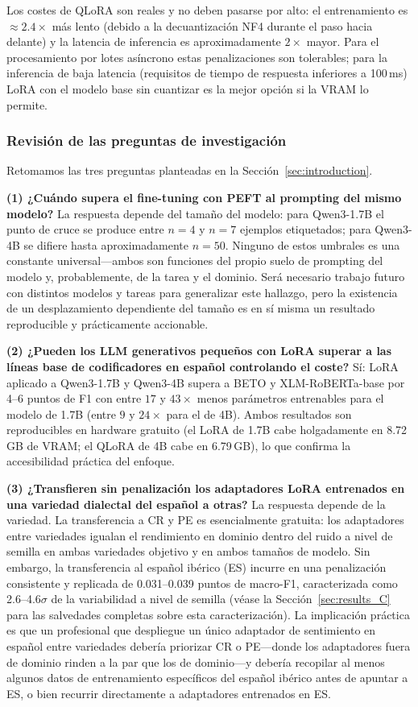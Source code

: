 \documentclass[conference]{IEEEtran}
\begin{document}
Los costes de QLoRA son reales y no deben pasarse por alto: el entrenamiento es
$\approx\!2.4\times$ más lento (debido a la decuantización NF4 durante el paso
hacia delante) y la latencia de inferencia es aproximadamente $2\times$ mayor.
Para el procesamiento por lotes asíncrono estas penalizaciones son tolerables;
para la inferencia de baja latencia (requisitos de tiempo de respuesta
inferiores a 100\,ms) LoRA con el modelo base sin cuantizar es la mejor opción
si la VRAM lo permite.

\subsubsection*{Revisión de las preguntas de investigación}

Retomamos las tres preguntas planteadas en la Sección~\ref{sec:introduction}.

\textbf{(1) ¿Cuándo supera el fine-tuning con PEFT al prompting del mismo
modelo?}
La respuesta depende del tamaño del modelo: para Qwen3-1.7B el punto de cruce se
produce entre $n=4$ y $n=7$ ejemplos etiquetados; para Qwen3-4B se difiere hasta
aproximadamente $n=50$.
Ninguno de estos umbrales es una constante universal---ambos son funciones del
propio suelo de prompting del modelo y, probablemente, de la tarea y el dominio.
Será necesario trabajo futuro con distintos modelos y tareas para generalizar
este hallazgo, pero la existencia de un desplazamiento dependiente del tamaño es
en sí misma un resultado reproducible y prácticamente accionable.

\textbf{(2) ¿Pueden los LLM generativos pequeños con LoRA superar a las líneas
base de codificadores en español controlando el coste?}
Sí: LoRA aplicado a Qwen3-1.7B y Qwen3-4B supera a BETO y
XLM-RoBERTa-base por 4--6 puntos de F1 con entre $17$ y $43\times$ menos
parámetros entrenables para el modelo de 1.7B (entre $9$ y $24\times$ para el de
4B).
Ambos resultados son reproducibles en hardware gratuito (el LoRA de 1.7B cabe
holgadamente en 8.72\,GB de VRAM; el QLoRA de 4B cabe en 6.79\,GB), lo que
confirma la accesibilidad práctica del enfoque.

\textbf{(3) ¿Transfieren sin penalización los adaptadores LoRA entrenados en una
variedad dialectal del español a otras?}
La respuesta depende de la variedad.
La transferencia a CR y PE es esencialmente gratuita: los adaptadores entre
variedades igualan el rendimiento en dominio dentro del ruido a nivel de semilla
en ambas variedades objetivo y en ambos tamaños de modelo.
Sin embargo, la transferencia al español ibérico (ES) incurre en una
penalización consistente y replicada de 0.031--0.039 puntos de macro-F1,
caracterizada como 2.6--4.6$\sigma$ de la variabilidad a nivel de semilla
(véase la Sección~\ref{sec:results_C} para las salvedades completas sobre esta
caracterización).
La implicación práctica es que un profesional que despliegue un único adaptador
de sentimiento en español entre variedades debería priorizar CR o PE---donde los
adaptadores fuera de dominio rinden a la par que los de dominio---y debería
recopilar al menos algunos datos de entrenamiento específicos del español
ibérico antes de apuntar a ES, o bien recurrir directamente a adaptadores
entrenados en ES.
\end{document}

